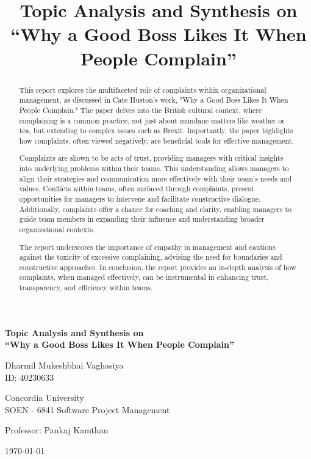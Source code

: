\documentclass[runningheads]{llncs}
\title{Topic Analysis and Synthesis on\\ ``Why a Good Boss Likes It When People
Complain''}
\begin{document}
%
\begin{titlepage}
    \centering
    \vspace*{1cm}
    
    \Large
    \textbf{Topic Analysis and Synthesis on \\ ``Why a Good Boss Likes It When People Complain''}
    
    \vspace{1.5cm}
    \normalsize
    Dharmil Mukeshbhai Vaghasiya\\
    ID: 40230633
    
    \vspace{1cm}
    Concordia University\\
    SOEN - 6841 Software Project Management
    
    \vspace{1.5cm}
    \normalsize
    Professor: Pankaj Kamthan
    
    \vfill
    \today %
\end{titlepage}

\setcounter{tocdepth}{2}
\tableofcontents

\newpage
\begin{abstract}
This report explores the multifaceted role of complaints within organizational management, as discussed in Cate Huston's work, "Why a Good Boss Likes It When People Complain." The paper delves into the British cultural context, where complaining is a common practice, not just about mundane matters like weather or tea, but extending to complex issues such as Brexit. Importantly, the paper highlights how complaints, often viewed negatively, are beneficial tools for effective management. 

Complaints are shown to be acts of trust, providing managers with critical insights into underlying problems within their teams. This understanding allows managers to align their strategies and communication more effectively with their team's needs and values. Conflicts within teams, often surfaced through complaints, present opportunities for managers to intervene and facilitate constructive dialogue. Additionally, complaints offer a chance for coaching and clarity, enabling managers to guide team members in expanding their influence and understanding broader organizational contexts.

The report underscores the importance of empathy in management and cautions against the toxicity of excessive complaining, advising the need for boundaries and constructive approaches. In conclusion, the report provides an in-depth analysis of how complaints, when managed effectively, can be instrumental in enhancing trust, transparency, and efficiency within teams.

\end{abstract}
\newpage
\end{document}
